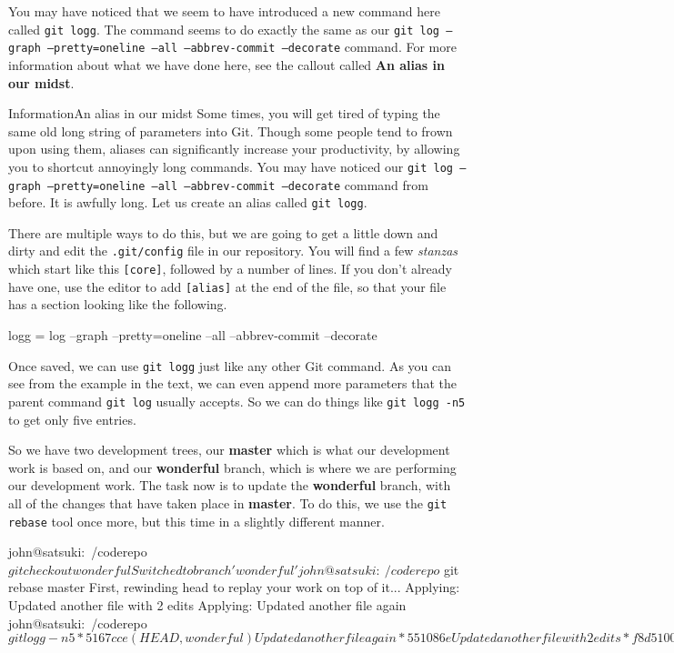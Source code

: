 You may have noticed that we seem to have introduced a new command here called \texttt{git logg}.
The command seems to do exactly the same as our \texttt{git log --graph --pretty=oneline --all --abbrev-commit --decorate} command.
For more information about what we have done here, see the callout called \textbf{An alias in our midst}.

\begin{callout}{Information}{An alias in our midst}
Some times, you will get tired of typing the same old long string of parameters into Git.
Though some people tend to frown upon using them, aliases can significantly increase your productivity, by allowing you to shortcut annoyingly long commands.
You may have noticed our \texttt{git log --graph --pretty=oneline --all --abbrev-commit --decorate} command from before.
It is awfully long.
Let us create an alias called \texttt{git logg}.

There are multiple ways to do this, but we are going to get a little down and dirty and edit the \texttt{.git/config} file in our repository.
You will find a few \emph{stanzas} which start like this \texttt{[core]}, followed by a number of lines.
If you don't already have one, use the editor to add \texttt{[alias]} at the end of the file, so that your file has a section looking like the following.

\begin{code}
[alias]
        logg = log --graph --pretty=oneline --all --abbrev-commit --decorate
\end{code}

Once saved, we can use \texttt{git logg} just like any other Git command.
As you can see from the example in the text, we can even append more parameters that the parent command \texttt{git log} usually accepts.
So we can do things like \texttt{git logg -n5} to get only five entries.
\end{callout}

So we have two development trees, our \textbf{master} which is what our development work is based on, and our \textbf{wonderful} branch, which is where we are performing our development work.
The task now is to update the \textbf{wonderful} branch, with all of the changes that have taken place in \textbf{master}.
To do this, we use the \texttt{git rebase} tool once more, but this time in a slightly different manner.

\begin{code}
john@satsuki:~/coderepo$ git checkout wonderful
Switched to branch 'wonderful'
john@satsuki:~/coderepo$ git rebase master
First, rewinding head to replay your work on top of it...
Applying: Updated another file with 2 edits
Applying: Updated another file again
john@satsuki:~/coderepo$ git logg -n5
* 5167cce (HEAD, wonderful) Updated another file again
* 551086e Updated another file with 2 edits
* f8d5100 (master) Finished new dev
* 1968324 Start new dev
* 1c3206a Added a new file
john@satsuki:~/coderepo$
\end{code}

